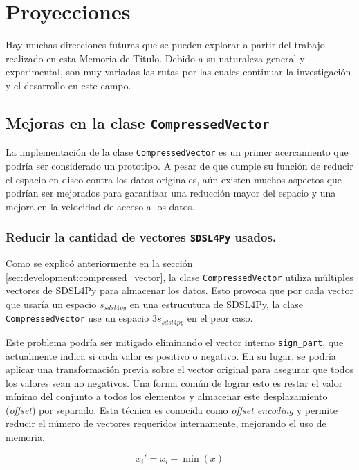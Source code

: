 \section{Proyecciones}

Hay muchas direcciones futuras que se pueden explorar a partir del trabajo realizado en esta Memoria de Título. Debido a su naturaleza general y experimental, son muy variadas las rutas por las cuales continuar la investigación y el desarrollo en este campo.

\subsection{Mejoras en la clase \texttt{CompressedVector}}

La implementación de la clase \texttt{CompressedVector} es un primer acercamiento que podría ser considerado un prototipo. A pesar de que cumple su función de reducir el espacio en disco contra los datos originales, aún existen muchos aspectos que podrían ser mejorados para garantizar una reducción mayor del espacio y una mejora en la velocidad de acceso a los datos.

\subsubsection{Reducir la cantidad de vectores \texttt{SDSL4Py} usados.}

Como se explicó anteriormente en la sección \ref{sec:development:compressed_vector}, la clase \texttt{CompressedVector} utiliza múltiples vectores de SDSL4Py para almacenar los datos. Esto provoca que por cada vector que usaría un espacio $s_{sdsl4py}$ en una estrucutura de SDSL4Py, la clase \texttt{CompressedVector} use un espacio $3s_{sdsl4py}$ en el peor caso. 

Este problema podría ser mitigado eliminando el vector interno \texttt{sign\_part}, que actualmente indica si cada valor es positivo o negativo. En su lugar, se podría aplicar una transformación previa sobre el vector original para asegurar que todos los valores sean no negativos. Una forma común de lograr esto es restar el valor mínimo del conjunto a todos los elementos y almacenar este desplazamiento (\textit{offset}) por separado. Esta técnica es conocida como \textit{offset encoding} y permite reducir el número de vectores requeridos internamente, mejorando el uso de memoria.

\begin{equation}
x_i' = x_i - \min(x)
\end{equation}

